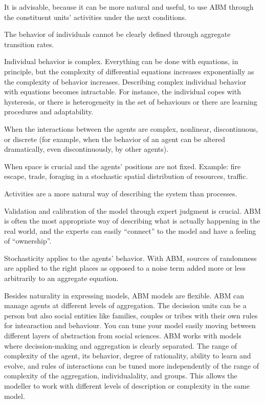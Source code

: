 \documentclass{report}
\begin{document}

It is advisable, because it can be more natural and useful, to use ABM through the constituent units' activities under the next conditions.
\begin{enumeration} 
\item The behavior of individuals cannot be clearly defined through aggregate transition rates.
\item Individual behavior is complex. Everything can be done with equations, in principle, but the complexity of differential equations increases exponentially as the complexity of behavior increases. Describing complex individual behavior with equations becomes intractable. For instance, the individual copes with hysteresis, or there is heterogeneity in the set of behaviours or there are learning procedures and adaptability.
\item When the interactions between the agents are complex, nonlinear, discontinuous, or discrete (for example, when the behavior of an agent can be altered dramatically, even discontinuously, by other agents).
\item When space is crucial and the agents' positions are not fixed. Example: fire escape, trade, foraging in a stochastic spatial distribution of resources, traffic.
\item Activities are a more natural way of describing the system than processes.
\item Validation and calibration of the model through expert judgment is crucial. ABM is often the most appropriate way of describing what is actually happening in the real world, and the experts can easily “connect” to the model and have a feeling of “ownership”. 
\item Stochasticity applies to the agents' behavior. With ABM, sources of randomness are applied to the right places as opposed to a noise term added more or less arbitrarily to an aggregate equation. 
\begin{end}

Besides naturality in expressing models, ABM models are flexible. ABM can manage agents at different levels of aggregation. The decission units can be a person but also social entities like families, couples or tribes with their own rules for intearaction and behaviour. You can tune your model easily moving between different layers of abstraction from social sciences. ABM works with models where decission-making and aggregation is clearly separated. The range of complexity of the agent,  its behavior, degree of rationality, ability to learn and evolve, and rules of interactions can be tuned more independently of the range of complexity of the aggregation, individualality, and groups. This allows the modeller to work with different levels of description or complexity in the same model. %


\end{end}
\end{enumeration}
\end{document}

